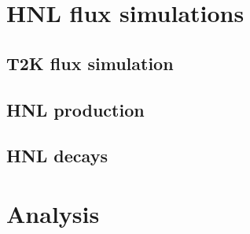 \documentclass[../main.tex]{subfiles}
\begin{document}
\begin{comment}
The statistical approach to the low level signal analysis is described in the Highland and Cousins work~\cite{cousins1992incorporating}. As number of the HNL decay events is proportional to the forth power of the mixing element, constraints on $\left|U_i\right|^2$ without systematics looks like:
\begin{equation}
  \left|U_i\right|^2_{limit}=\sqrt{\frac{U_n}{N_{events}}}
  \label{eq:constraints}
\end{equation}
where $i=e,\mu$, $U_n$ is 90\% C.L. Poisson limit for $n$ observed events and $N_{events}$ is expected number of signal events assuming $\left|U\right|^2=1$. If we take into account the detector acceptance uncertainty, the result can be calculated according to Ref.~\cite{cousins1992incorporating}:
\begin{equation}
  U_n=U_{n0}\left\{1+E_n\frac{\sigma^2_{Acc}}{2}\left(1+\left(\frac{E_n\sigma_{Acc}}{2}\right)^2\right)\right\}
  \label{eq:constrainsAcc}
\end{equation}
where $U_{n0}$ is 90\% C.L. Poisson limit for $n$ observed events, $\sigma_{Acc}$ is the acceptance error, $E_n=U_{n0}-n$ represents the excess of the upper limit of
a Poisson parameter over the number n of observed events, for a specified confidence level. This approach can be applied only while $\sigma_{Acc}<1/E_n$. We will show that in our study $\sigma_{Acc}\approx0.3$ and $1/E_n>0.5$ (this values are described in the section~\ref{sec:syst}). So this method can be applied for the analysis.
\end{comment}




\chapter{HNL flux simulations}
\section{T2K flux simulation}
\section{HNL production}
\section{HNL decays}
\chapter{Analysis}
\label{HNL:ana}
\end{document}
